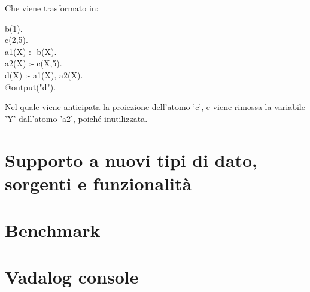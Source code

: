 Che viene trasformato in:

\begin{algorithm}[h]
	b(1). \\
	c(2,5). \\
	a1(X) :- b(X). \\
	a2(X) :- c(X,5). \\
	d(X) :- a1(X), a2(X). \\
	@output("d").
\end{algorithm}

Nel quale viene anticipata la proiezione dell'atomo 'c', e viene rimossa la variabile 'Y' dall'atomo 'a2', poiché inutilizzata. \newline \newline



\section{Supporto a nuovi tipi di dato, sorgenti e funzionalità}

\section{Benchmark}

\section{Vadalog console}